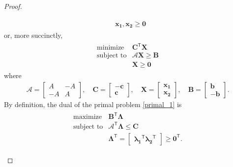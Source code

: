 \documentclass[12pt]{article}
\theoremstyle{definition}
\newcommand{\vc}[1]{\boldsymbol{#1}}
\newcommand{\tran}{\mathsf{T}}
\begin{document}
\begin{proof}
\begin{enumerate}
\begin{align*}
\begin{array}{rl}
          & \vc{x_1}, \vc{x_2} \geq \vc{0}
        \end{array}
      \end{align*}
      or, more succinctly,
      \begin{align}\label{primal_1}
        \begin{array}{rl}
          \text{minimize} & \vc{C}^\tran \vc{X} \\
          \text{subject to} & \mathscr{A}\vc{X} \geq \vc{B} \\
          & \vc{X} \geq \vc{0}
        \end{array}
      \end{align}
      where
      \begin{align}\label{primal_def}
        \mathscr{A} = \begin{bmatrix}A & -A \\ -A & A\end{bmatrix}, \quad \vc{C} = \begin{bmatrix}-\vc{c} \\ \vc{c}\end{bmatrix}, \quad
        \vc{X} = \begin{bmatrix}\vc{x_1} \\ \vc{x_2}\end{bmatrix}, \quad \vc{B} = \begin{bmatrix}\vc{b} \\ -\vc{b}\end{bmatrix}.
      \end{align}
      By definition, the dual of the primal problem \eqref{primal_1} is
      \begin{align}\label{dual}
        \begin{array}{rl}
          \text{maximize} & \vc{B}^\tran \vc{\Lambda}\\
          \text{subject to} & \mathscr{A}^\tran \vc{\Lambda} \leq \vc{C} \\
          & \vc{\Lambda}^\tran = \begin{bmatrix}\vc{\lambda_1}^\tran \vc{\lambda_2}^\tran\end{bmatrix} \geq \vc{0}^\tran.
        \end{array}
      \end{align}


\end{enumerate}
\end{proof}
\end{document}
